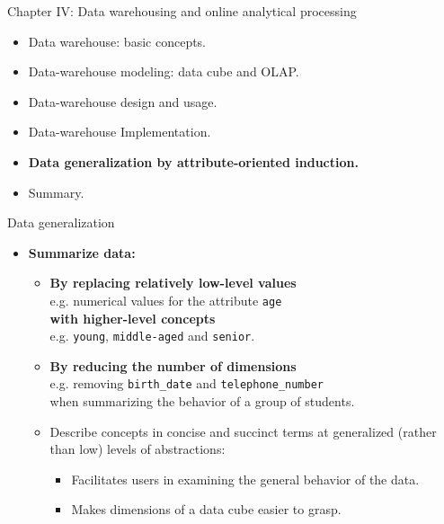 \documentclass[aspectratio=169,t]{beamer}
\begin{document}
  { 
    \begin{frame}{Chapter IV: Data warehousing and online analytical processing}
        \begin{itemize}
            \item Data warehouse: basic concepts.
            \item Data-warehouse modeling: data cube and OLAP.
            \item Data-warehouse design and usage.
            \item Data-warehouse Implementation.
            \item \textbf{Data generalization by attribute-oriented induction.}
            \item Summary.
        \end{itemize}
    \end{frame}
  }

  { 
    \begin{frame}{Data generalization}
    \begin{itemize}
      \item \textbf{Summarize data:}
      \begin{itemize}
        \item \textbf{By replacing relatively low-level values} \\
        e.g. numerical values for the attribute \texttt{age} \\
        \textbf{with higher-level concepts}\\
        e.g. \texttt{young}, \texttt{middle-aged} and \texttt{senior}.
        \item \textbf{By reducing the number of dimensions}\\
              e.g. removing \texttt{birth\_date} and \texttt{telephone\_number} \\ when summarizing the behavior of a group of students.
        \item Describe concepts in concise and succinct terms at generalized (rather than low) levels of abstractions:
        \begin{itemize}
          \item Facilitates users in examining the general behavior of the data.
          \item Makes dimensions of a data cube easier to grasp.
        \end{itemize}
      \end{itemize}
    \end{itemize}
    \end{frame}
  }
\end{document}
